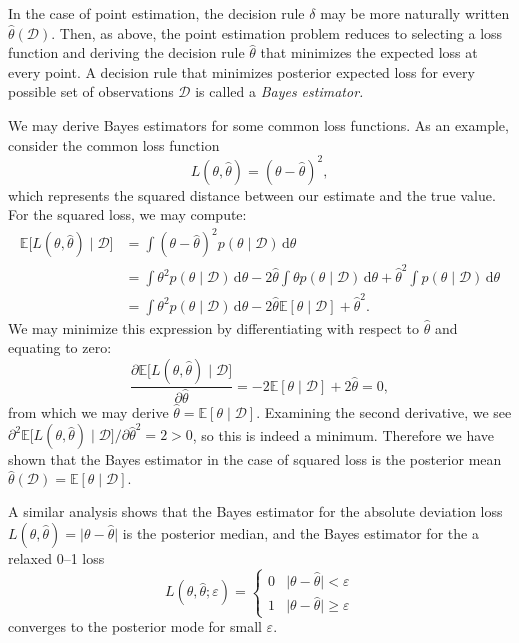 \documentclass{article}
\newcommand{\given}{\mid}
\newcommand{\mc}[1]{\mathcal{#1}}
\newcommand{\data}{\mc{D}}
\newcommand{\intd}[1]{\,\mathrm{d}{#1}}
\begin{document}
In the case of point estimation, the decision rule $\delta$ may be
more naturally written $\hat{\theta}(\data)$.  Then, as above, the
point estimation problem reduces to selecting a loss function and
deriving the decision rule $\hat{\theta}$ that minimizes the expected
loss at every point.  A decision rule that minimizes posterior
expected loss for every possible set of observations $\data$ is called
a \emph{Bayes estimator.}

We may derive Bayes estimators for some common loss functions.  As an
example, consider the common loss function
\begin{equation*}
  L(\theta, \hat{\theta})
  =
  (\theta - \hat{\theta})^2,
\end{equation*}
which represents the squared distance between our estimate and the
true value.  For the squared loss, we may compute:
\begin{align*}
  \mathbb{E}\bigl[L(\theta, \hat{\theta}) \given \data \bigr]
  &=
  \int
  (\theta - \hat{\theta})^2
  p(\theta \given \data)
  \intd{\theta}
  \\
  &=
  \int
  \theta^2
  p(\theta \given \data)
  \intd{\theta}
  -
  2
  \hat{\theta}
  \int
  \theta
  p(\theta \given \data)
  \intd{\theta}
  +
  \hat{\theta}^2
  \int
  p(\theta \given \data)
  \intd{\theta}
  \\
  &=
  \int
  \theta^2
  p(\theta \given \data)
  \intd{\theta}
  -
  2
  \hat{\theta}
  \mathbb{E}[\theta \given \data]
  +
  \hat{\theta}^2
  .
\end{align*}
We may minimize this expression by differentiating with respect to
$\hat{\theta}$ and equating to zero:
\begin{equation*}
  \frac{\partial \mathbb{E}\bigl[L(\theta, \hat{\theta}) \given \data \bigr]}
       {\partial \hat{\theta}}
  =
  -2\mathbb{E}[\theta \given \data]
  +
  2\hat{\theta}
  =
  0,
\end{equation*}
from which we may derive $\hat{\theta} = \mathbb{E}[\theta \given
  \data]$.  Examining the second derivative, we see $\partial^2
\mathbb{E}\bigl[L(\theta, \hat{\theta}) \given \data \bigr] / \partial
\hat{\theta}^2 = 2 > 0$, so this is indeed a minimum.  Therefore we
have shown that the Bayes estimator in the case of squared loss is the
posterior mean $\hat{\theta}(\data) = \mathbb{E}[\theta \given
  \data].$

A similar analysis shows that the Bayes estimator for the absolute
deviation loss $L(\theta, \hat{\theta}) = \lvert \theta - \hat{\theta}
\rvert$ is the posterior median, and the Bayes estimator for the a
relaxed 0--1 loss
\begin{equation*}
  L(\theta, \hat{\theta}; \varepsilon)
  =
  \begin{cases}
    0 & \lvert \theta - \hat{\theta} \rvert   < \varepsilon \\
    1 & \lvert \theta - \hat{\theta} \rvert \geq \varepsilon
  \end{cases}
\end{equation*}
converges to the posterior mode for small $\varepsilon$.
\end{document}
